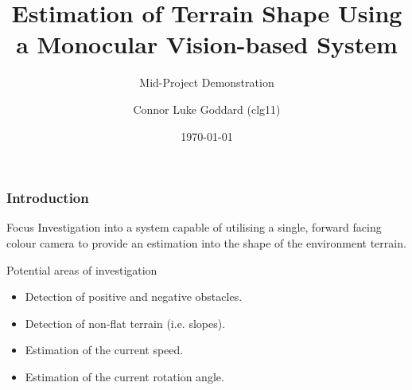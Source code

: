 \documentclass[10pt, compress]{beamer}
\title{Estimation of Terrain Shape Using a Monocular Vision-based System}
\subtitle{Mid-Project Demonstration}
\date{\today}
\author{Connor Luke Goddard (clg11)}
\institute{Aberystwyth University}
\begin{document}
\maketitle

\begin{frame}[fragile]
  \frametitle{Introduction}

  
  \begin{block}{Focus}
    Investigation into a system capable of utilising a single, forward facing colour camera to provide an estimation into the shape of the environment terrain. 
  \end{block}
  
  \begin{block}{Potential areas of investigation}
    \begin{itemize}
  \item Detection of positive and negative obstacles.
  \item Detection of non-flat terrain (i.e. slopes).
  \item Estimation of the current speed.
  \item Estimation of the current rotation angle.
  \end{itemize}
  \end{block}

\end{frame}

\end{document}
